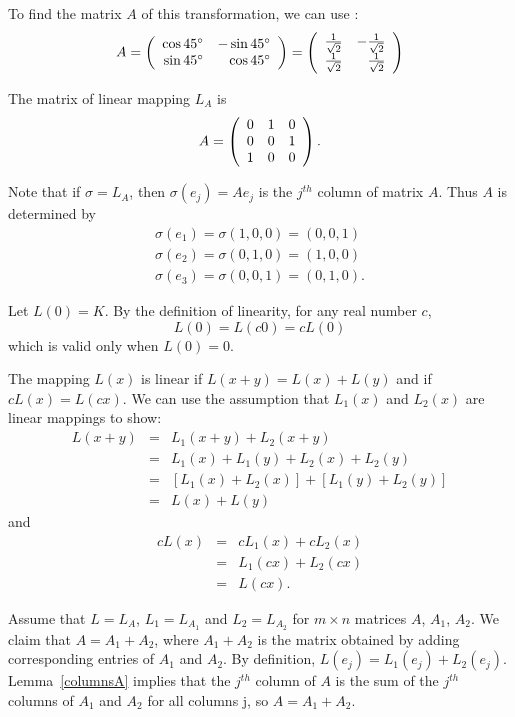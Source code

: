 \documentclass{ximera}
\begin{document}
\para To find the matrix $A$ of this transformation, we can use
:
\[ A = \left(\begin{array}{rr} \cos 45^\circ & -\sin 45^\circ\\ \sin 45^\circ &\cos 45^\circ\end{array}\right)
= \left(\begin{array}{rr} \frac{1}{\sqrt{2}} & -\frac{1}{\sqrt{2}}\\ \frac{1}{\sqrt{2}} &\frac{1}{\sqrt{2}}\end{array}\right) \]

\begin{figure}[htb]
                       \centerline{%
                       }
\end{figure}

\ans The matrix of linear mapping $L_A$ is
\[ A = \left(\begin{array}{rrr} 0 & 1 & 0 \\ 0 & 0 & 1 \\ 1 & 0 & 0\end{array}\right). \]

\soln Note that if $\sigma = L_A$, then $\sigma(e_j) = Ae_j$ is the
$j^{th}$ column of matrix $A$.  Thus $A$ is determined by
\[
\begin{array}{l}
\sigma(e_1) = \sigma(1,0,0) = (0,0,1) \\
\sigma(e_2) = \sigma(0,1,0) = (1,0,0) \\
\sigma(e_3) = \sigma(0,0,1) = (0,1,0). \end{array}
\]


Let $L(0) = K$.
By the definition of linearity, for any real number $c$,
\[ L(0) = L(c0) = cL(0) \]
which is valid only when $L(0) = 0$.

The mapping $L(x)$ is linear if $L(x + y) = L(x) + L(y)$ and
if $cL(x) = L(cx)$.  We can use the assumption that $L_1(x)$
and $L_2(x)$ are linear mappings to show:
\[ \begin{array}{rcl}
L(x + y) & = & L_1(x + y) + L_2(x + y) \\
& = & L_1(x) + L_1(y) + L_2(x) + L_2(y) \\
& = & [L_1(x) + L_2(x)] + [L_1(y) + L_2(y)] \\
& = & L(x) + L(y) \end{array} \]
and
\[ \begin{array}{rcl}
cL(x) & = & cL_1(x) + cL_2(x) \\
& = & L_1(cx) + L_2(cx) \\
& = & L(cx). \end{array} \]

Assume that $L = L_A$, $L_1 = L_{A_1}$ and $L_2 = L_{A_2}$ for
$m \times n$ matrices $A$, $A_1$, $A_2$.  We claim that
$A = A_1 + A_2$, where $A_1 + A_2$ is the matrix obtained by
adding corresponding entries of $A_1$ and $A_2$.  By
definition, $L(e_j) = L_1(e_j) + L_2(e_j)$.  Lemma~\ref{columnsA}
implies that the $j^{th}$ column of $A$ is the sum of the
$j^{th}$ columns of $A_1$ and $A_2$ for all columns {j}, so
$A = A_1 + A_2$.
\end{document}
